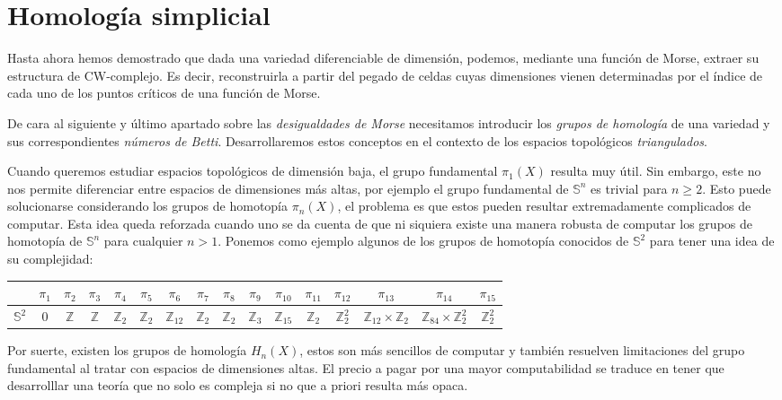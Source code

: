 \section{Homología simplicial}

Hasta ahora hemos demostrado que dada una variedad diferenciable de dimensión, podemos, mediante una función de Morse, extraer su estructura de CW-complejo. Es decir, reconstruirla a partir del pegado de celdas cuyas dimensiones vienen determinadas por el índice de cada uno de los puntos críticos de una función de Morse.

De cara al siguiente y último apartado sobre las \textit{desigualdades de Morse} necesitamos introducir los \textit{grupos de homología} de una variedad y sus correspondientes \textit{números de Betti}. Desarrollaremos estos conceptos en el contexto de los espacios topológicos \textit{triangulados}.

Cuando queremos estudiar espacios topológicos de dimensión baja, el grupo fundamental $\pi_1(X)$ resulta muy útil. Sin embargo, este no nos permite diferenciar entre espacios de dimensiones más altas, por ejemplo el grupo fundamental de $\mathbb{S}^n$ es trivial para $n\ge 2$. Esto puede solucionarse considerando los grupos de homotopía $\pi_n(X)$, el problema es que estos pueden resultar extremadamente complicados de computar. Esta idea queda reforzada cuando uno se da cuenta de que ni siquiera existe una manera robusta de computar los grupos de homotopía de $\mathbb{S}^n$ para cualquier $n>1$. Ponemos como ejemplo algunos de los grupos de homotopía conocidos de $\mathbb{S}^2$ para tener una idea de su complejidad:
\begin{center}
    \begin{tabular}{c|ccccccccccccccc}
    & $\pi_1$ & $\pi_2$ & $\pi_3$ & $\pi_4$ & $\pi_5$ & $\pi_6$ & $\pi_7$ & $\pi_8$ & $\pi_9$ & $\pi_{10}$ & $\pi_{11}$ & $\pi_{12}$ & $\pi_{13}$ & $\pi_{14}$ & $\pi_{15}$ \\
    \hline
    $\mathbb{S}^2$ & $0$ & $\mathbb{Z}$ & $\mathbb{Z}$ & $\mathbb{Z}_2$ & $\mathbb{Z}_2$ & $\mathbb{Z}_{12}$ & $\mathbb{Z}_2$ & $\mathbb{Z}_2$ & $\mathbb{Z}_3$ & $\mathbb{Z}_{15}$ & $\mathbb{Z}_2$ & $\mathbb{Z}_2^2$ & $\mathbb{Z}_{12}\times \mathbb{Z}_2$ & $\mathbb{Z}_{84}\times \mathbb{Z}_2^2$ & $\mathbb{Z}_2^2$
    \end{tabular}
\end{center}
\vspace{1em}

Por suerte, existen los grupos de homología $H_n(X)$, estos son más sencillos de computar y también resuelven limitaciones del grupo fundamental al tratar con espacios de dimensiones altas. El precio a pagar por una mayor computabilidad se traduce en tener que desarrolllar una teoría que no solo es compleja si no que a priori resulta más opaca.

